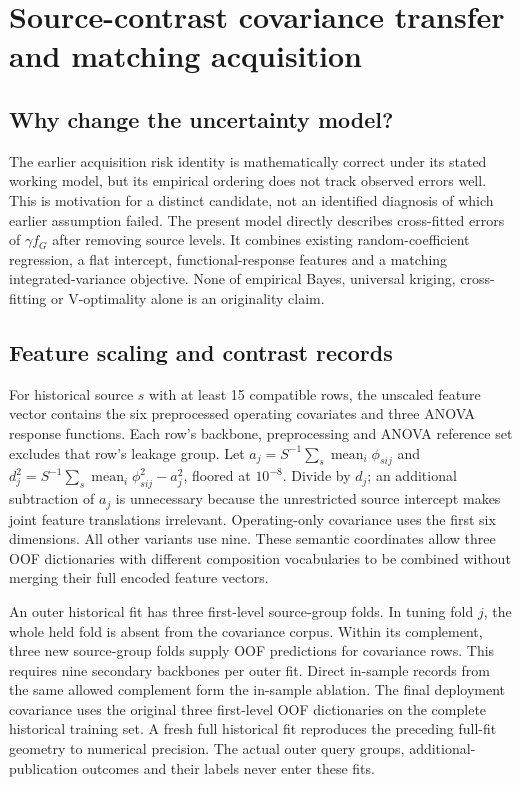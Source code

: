 \documentclass[11pt]{article}
\begin{document}
\clearpage
\section{Source-contrast covariance transfer and matching acquisition}
\subsection{Why change the uncertainty model?}
The earlier acquisition risk identity is mathematically correct under its stated working model, but its empirical ordering does not track observed errors well. This is motivation for a distinct candidate, not an identified diagnosis of which earlier assumption failed. The present model directly describes cross-fitted errors of $\gamma f_G$ after removing source levels. It combines existing random-coefficient regression, a flat intercept, functional-response features and a matching integrated-variance objective. None of empirical Bayes, universal kriging, cross-fitting or V-optimality alone is an originality claim.

\subsection{Feature scaling and contrast records}
For historical source $s$ with at least 15 compatible rows, the unscaled feature vector contains the six preprocessed operating covariates and three ANOVA response functions. Each row's backbone, preprocessing and ANOVA reference set excludes that row's leakage group. Let $a_j=S^{-1}\sum_s\operatorname{mean}_i \phi_{sij}$ and $d_j^2=S^{-1}\sum_s\operatorname{mean}_i\phi_{sij}^2-a_j^2$, floored at $10^{-8}$. Divide by $d_j$; an additional subtraction of $a_j$ is unnecessary because the unrestricted source intercept makes joint feature translations irrelevant. Operating-only covariance uses the first six dimensions. All other variants use nine. These semantic coordinates allow three OOF dictionaries with different composition vocabularies to be combined without merging their full encoded feature vectors.

An outer historical fit has three first-level source-group folds. In tuning fold $j$, the whole held fold is absent from the covariance corpus. Within its complement, three new source-group folds supply OOF predictions for covariance rows. This requires nine secondary backbones per outer fit. Direct in-sample records from the same allowed complement form the in-sample ablation. The final deployment covariance uses the original three first-level OOF dictionaries on the complete historical training set. A fresh full historical fit reproduces the preceding full-fit geometry to numerical precision. The actual outer query groups, additional-publication outcomes and their labels never enter these fits.
\end{document}
